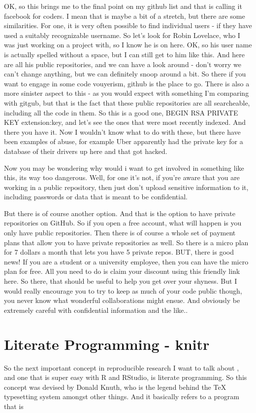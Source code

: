 \documentclass[12pt]{article}
\begin{document}
OK, so this brings me to the final point on my github list and that is calling it facebook for coders. I mean that is maybe a bit of a stretch, but there are some similarities. For one, it is very often possible to find individual users - if they have used a suitably recognizable username. So let's look for Robin Lovelace, who I was just working on a project with, so I know he is on here. OK, so his user name is actually spelled without a space, but I can still get to him like this. And here are all his public repositories, and we can have a look around - don't worry we can't change anything, but we can definitely snoop around a bit. So there if you want to engage in some code vouyerism, github is the place to go. 
There is also a more sinister aspect to this - as you would expect with something I'm comparing with gitgub, but that is the fact that these public repositories are all searcheable, including all the code in them. So this is a good one, BEGIN RSA PRIVATE KEY extension:key, and let's see the ones that were most recently indexed. And there you have it. Now I wouldn't know what to do with these, but there have been examples of abuse, for example Uber apparently had the private key for a database of their drivers up here and that got hacked. 

Now you may be wondering why would i want to get involved in something like this, its way too dangerous. Well, for one it's not, if you're aware that you are working in a public repository, then just don't upload sensitive information to it, including passwords or data that is meant to be confidential. 

But there is of course another option. And that is the option to have private repositories on GitHub. So if you open a free account, what will happen is you only have public repositories. Then there is of course a whole set of payment plans that allow you to have private repositories as well. So there is a micro plan for 7 dollars a month that lets you have 5 private repos. BUT, there is good news! If you are a student or a university employee, then you can have the micro plan for free. All you need to do is claim your discount using this friendly link here. So there, that should be useful to help you get over your shyness. But I would really encourage you to try to keep as much of your code public though, you never know what wonderful collaborations might ensue. And obviously be extremely careful with confidential information and the like.. 

\section{Literate Programming - knitr}

So the next important concept in reproducible research  I want to talk about , and one that is super easy with R and RStudio, is literate programming. So this concept was devised by Donald Knuth, who is the legend behind the TeX typesetting system amongst other things. And it basically refers to a program that is  
\end{document}
